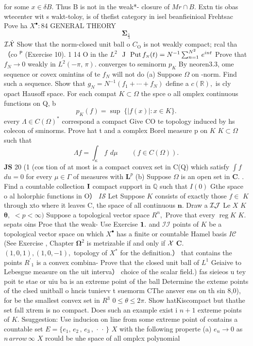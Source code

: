 for some $x\in\delta B.$ Thus B is not in the weak*- closure of $M r\cap B.$ Extn tis obas wtecenter wit s wakt-toloy, is of thefist category in isel beanfieinioal Frehtsac Pove ha $X^{\bullet}{\mathrm{:}}$84 GENERAL THEORY $$ \mathbf{\Sigma}_{\frac{1}{\lambda}} $$ ${\cal I}\dot{{\cal X}}$ Show that the norm-closed unit ball o $C_{\mathrm{O}}$ is not weakly compact; rcal tha （co ${}^{\mathsf{P}}$ (Exercise 10). 1 14 O in the $L^{2}$ $\mathrm{\boldmath~J~}\mathrm{\boldmath~Put}\,f_{\scriptscriptstyle N}(t)=N^{-1}\sum_{n=1}^{N^{2}}\,e^{i n t}$ Prove that $f_{N}\to0$ weakly in $L^{2}(-\pi,\,\pi).$ converges to seminorm $p_{K}$ By neoren3.3, ome sequence or covex omintins of te $f_{N}$ will not do (a) Suppose $\Omega$ on -norm. Find such a sequence. Show that $g_{N}=N^{-1}(f_{1}+\cdots+f_{N})$ define a $c(\mathbb{R}),$ is cly opact Hausoff space. For each compat $K\subset\Omega$ the spce o all omplex continuous functions on Q, b $$ p_{K}(f)=\operatorname*{sup}\;\{|f(x)|:x\in K\}. $$ every $\Lambda\in C(\Omega)^{*}$ correspond a compact Give CO te topology induced by hs colecon of sminorms. Prove hat t and a complex Borel measure p on $\textstyle K$ $K\subset\Omega$ such that $$ \Lambda f=\int_{\kappa}\,f\ \,d\mu\qquad(f\in C(\Omega)). $$ ${\boldsymbol{J}}{\boldsymbol{S}}$ 20 (1 (cos tion of at most is a compact convex set in C(Q) which satisfy $\int f$ $d u=0$ for every $\mu\in\Gamma$ of measures with ${\boldsymbol{L}}^{p}$ (b) Suppose $\Omega$ is an open set in ${\boldsymbol{C}}.$ . Find a countable collection ${\bf I}$ compact support in $\mathbb{Q}$ such that $\scriptstyle I(0)$ Gthe space o al holorphic functions in O） $I{\mathcal{S}}$ Let Suppose $\textstyle K$ consists of exactly those $f\in$ $\textstyle K$ through xto where it leaves C, the space of all continuous ${\boldsymbol{n}}.$ Draw a ${\cal{I}}{\cal{J}}$ Le $\textstyle X$ $\textstyle K$ ${\boldsymbol{\theta}},$ $<p<\infty)$ Suppose a topological vector space $R^{n},$ Prove that every $\operatorname{reg}K$ $K.$ sepats oins Proe that the weak- Use Exercise ${\bf1}.$ and ${\mathcal{I}}{\mathcal{I}}$ points of $\displaystyle K$ be a topological vector space on which $X^{\bullet}$ has a finite or countable Hamel basis $I{\mathcal{C}}$ (See Exercise , Chapter $\mathbf{\Omega}^{2}$ is metrizable if and only if $\textstyle{\cal{X}}$ ${\boldsymbol{C}}.$ $(1,0,1),(1,0,-1),$ topology of $X^{\ast}$ for the definition.） that contains the points $\scriptstyle R^{\prime}{}_{1}$ is a convex combina- Prove that the closed unit ball of $L^{1}$ Geiaive to Lebesgue measure on the uit interva） choice of the scalar field.) fas sieieos u tey poit te stae or uiu ba is an extreme point of the ball Determine the exteme points of the clsed unitball o hncis tunievv t suemorm CThe ansver ens on th sin 8,0), for be the smallest convex set in $R^{3}$ $0\leq\theta\leq2\pi.$ Show hatKiscompact but thathe set fall xtrem is no compact. Does such an example exist i $n+1$ extreme points of $K.$ Ssuggestion: Use inducion on line from some extreme point of contains a countable set $E=\{e_{1},\,e_{2}\,,\,e_{3}\,,\,\cdot\,\cdot\,\}$ $\textstyle X$ with the following properte (a) $e_{n}\to0$ as $\scriptstyle n\, arrow\,\infty$ $X$ rcould be uhe space of all omplcx polynomial 